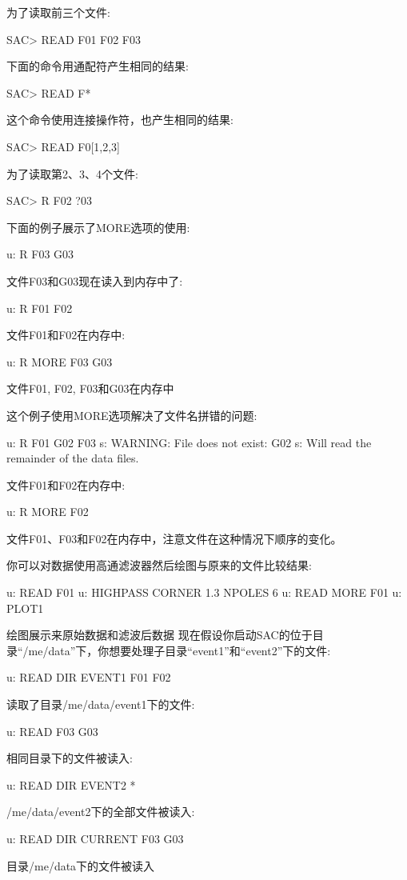 为了读取前三个文件:
\begin{SACCode}
SAC> READ F01 F02 F03
\end{SACCode}

下面的命令用通配符产生相同的结果:
\begin{SACCode}
SAC> READ F*
\end{SACCode}

这个命令使用连接操作符，也产生相同的结果:
\begin{SACCode}
SAC> READ F0[1,2,3]
\end{SACCode}

为了读取第2、3、4个文件:
\begin{SACCode}
SAC> R F02 ?03
\end{SACCode}

下面的例子展示了MORE选项的使用:
\begin{SACCode}
u: R F03 G03
\end{SACCode}
文件F03和G03现在读入到内存中了:
\begin{SACCode}
u: R F01 F02
\end{SACCode}
文件F01和F02在内存中:
\begin{SACCode}
u: R MORE F03 G03
\end{SACCode}
文件F01, F02, F03和G03在内存中

这个例子使用MORE选项解决了文件名拼错的问题:
\begin{SACCode}
u: R F01 G02 F03
s: WARNING: File does not exist: G02
s: Will read the remainder of the data files.
\end{SACCode}
文件F01和F02在内存中:
\begin{SACCode}
u: R MORE F02
\end{SACCode}
文件F01、F03和F02在内存中，注意文件在这种情况下顺序的变化。

你可以对数据使用高通滤波器然后绘图与原来的文件比较结果:
\begin{SACCode}
u: READ F01
u: HIGHPASS CORNER 1.3 NPOLES 6
u: READ MORE F01
u: PLOT1
\end{SACCode}
绘图展示来原始数据和滤波后数据
现在假设你启动SAC的位于目录``/me/data''下，你想要处理子目录``event1''和``event2''下的文件:
\begin{SACCode}
u: READ DIR EVENT1 F01 F02
\end{SACCode}
读取了目录/me/data/event1下的文件:
\begin{SACCode}
u: READ F03 G03
\end{SACCode}
相同目录下的文件被读入:
\begin{SACCode}
u: READ DIR EVENT2 *
\end{SACCode}
/me/data/event2下的全部文件被读入:
\begin{SACCode}
u: READ DIR CURRENT F03 G03
\end{SACCode}
目录/me/data下的文件被读入

